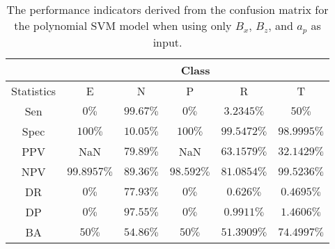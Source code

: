 \begin{table}[!ht]
	\centering
	\begin{tabular}{|c|c|c|c|c|c|}
		\hline
		 & \multicolumn{5}{c|}{Class} \\ \hline
		Statistics & E & N & P & R & T \\ \hline
		Sen & $0\%$ & $99.67\%$ & $0\%$ & $3.2345\%$ & $50\%$ \\ \hline
		Spec & $100\%$ & $10.05\%$ & $100\%$ & $99.5472\%$ & $98.9995\%$ \\ \hline
		PPV & NaN & $79.89\%$ & NaN & $63.1579\%$ & $32.1429\%$ \\ \hline
		NPV & $99.8957\%$ & $89.36\%$ & $98.592\%$ & $81.0854\%$ & $99.5236\%$ \\ \hline
		DR & $0\%$ & $77.93\%$ & $0\%$ & $0.626\%$ & $0.4695\%$ \\ \hline
		DP & $0\%$ & $97.55\%$ & $0\%$ & $0.9911\%$ & $1.4606\%$ \\ \hline
		BA & $50\%$ & $54.86\%$ & $50\%$ & $51.3909\%$ & $74.4997\%$ \\ \hline
	\end{tabular}
	\caption{The performance indicators derived from the confusion matrix for the polynomial SVM model when using only $B_{x}$, $B_{z}$, and $a_{p}$ as input.}
	\label{tab:cs:reverse:xzap:svmPoly}
\end{table}

